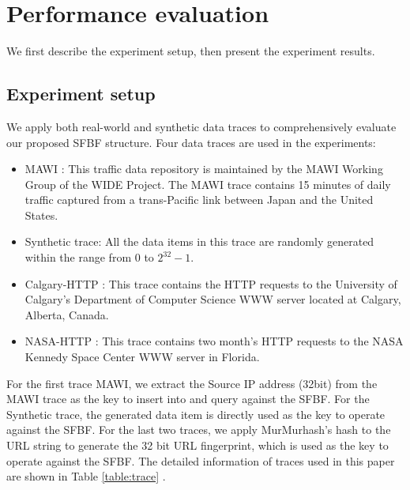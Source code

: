 \documentclass[10pt,journal,compsoc]{IEEEtran}
\begin{document}
\section{Performance evaluation}
\label{sec:simulation}
We first describe the experiment setup, then present the experiment results.
\subsection{Experiment setup}
We apply both real-world and synthetic data traces to comprehensively evaluate our proposed SFBF structure. Four data traces are used in the experiments:

\begin{itemize}
  \item MAWI \cite{MAWI}: This traffic data repository is maintained by the MAWI Working Group of the WIDE Project. The MAWI trace  contains 15 minutes of daily traffic captured from a trans-Pacific link between Japan and the United States. %
  \item Synthetic trace: All the data items in this trace are randomly generated within the range from 0 to $2^{32}-1$.
  \item Calgary-HTTP \cite{Calgary}: This trace contains the HTTP requests to the University of Calgary's Department of Computer Science WWW server located at Calgary, Alberta, Canada.
  \item NASA-HTTP \cite{NASA}: This trace contains two month's  HTTP requests to the NASA Kennedy Space Center WWW server in Florida.
\end{itemize}


For the first trace MAWI, we extract the Source IP address (32bit) from the MAWI trace  as the key  to insert into and query against the SFBF. For the Synthetic trace, the generated data item is directly used as the key to operate against the SFBF.
For the last two  traces, we apply MurMurhash's hash to the URL string to generate the 32 bit URL fingerprint,  which is used as the key to operate against the SFBF. %
The detailed information of traces used in this paper are shown in Table \ref{table:trace} .
\end{document}
